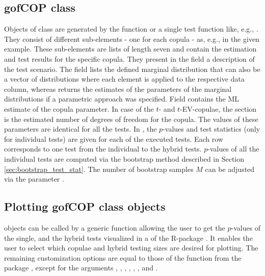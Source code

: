 \subsection{gofCOP class}\label{subsec:gofCOP}
Objects of class  are generated by the function  or a single test function like, e.g., . They consist of different sub-elements - one for each copula - as, e.g.,  in the given example. These sub-elements are lists of length seven and contain the estimation and test results for the specific copula. They present in the field  a description of the test scenario. The field  lists the defined marginal distribution that can also be a vector of distributions where each element is applied to the respective data column, whereas  returns the estimates of the parameters of the marginal distributions if a parametric approach was specified. \mycolor Field \bk {} contains the ML estimate of the copula parameter. In case of the $t$- \mycolor and $t$-EV-copulae\bk, the section  is the estimated number of degrees of freedom for the copula. The values of these parameters are identical for all the tests. In , the $p$-values and test statistics (only for individual tests) are given for each of the executed tests. Each row corresponds to one test from the individual to the hybrid tests. $p$-values of all the individual tests are computed via the bootstrap method described in Section \ref{sec:bootstrap_test_stat}. The number of bootstrap samples $M$ can be adjusted via the parameter .

\mycolor
\subsection{Plotting gofCOP class objects}\label{subsec:gofCOP_plot}
\bk {} objects can be called by a generic  function allowing the user to get the $p$-values of the single, and the hybrid tests visualized in a  of the R-package . \mycolor It enables the user to select which copulae and hybrid testing sizes are desired for plotting. The remaining customization options are equal to those of the function  from the package , except for the arguments , , , , , , and .

